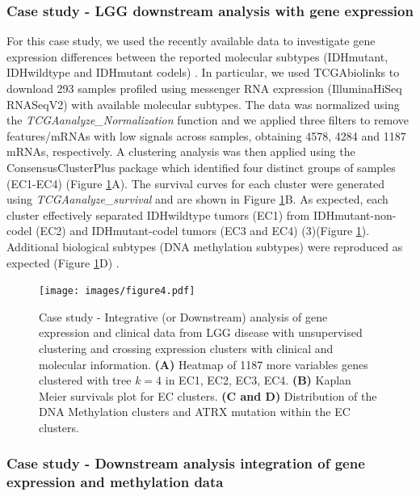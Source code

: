 \subsubsection*{Case study - LGG downstream analysis with gene expression}

For this case study, we used the recently available  data to investigate gene expression differences between the reported molecular subtypes (IDHmutant, IDHwildtype and IDHmutant codels) \cite{platforms2015comprehensive}. In particular, we used TCGAbiolinks to download 293 samples profiled using messenger RNA expression (IlluminaHiSeq RNASeqV2) with available molecular subtypes. The data was normalized using the \textit{TCGAanalyze\_Normalization} function and we applied three filters to remove features/mRNAs with low signals across samples, obtaining 4578, 4284 and 1187 mRNAs, respectively. A clustering analysis was then applied using the ConsensusClusterPlus package \cite{wilkerson2010consensusclusterplus} which identified four distinct groups of samples (EC1-EC4) (Figure \ref{fig:caseexp}A). The survival curves for each cluster were generated using \textit{TCGAanalyze\_survival} and are shown in Figure \ref{fig:caseexp}B. As expected, each cluster effectively separated IDHwildtype tumors (EC1) from IDHmutant-non-codel (EC2) and IDHmutant-codel tumors (EC3 and EC4) (3)(Figure \ref{fig:caseexp}). Additional biological subtypes (DNA methylation subtypes) were reproduced as expected (Figure \ref{fig:caseexp}D) \cite{platforms2015comprehensive}.

\begin{figure}
\centering
\texttt{[image: images/figure4.pdf]}
\caption[Case study - LGG downstream analysis with gene expression]{Case study - Integrative (or Downstream) analysis of gene expression and clinical data from LGG disease with unsupervised clustering and crossing expression clusters with clinical and molecular information. \textbf{(A)} Heatmap of 1187 more variables genes clustered with tree $k = 4$ in EC1, EC2, EC3, EC4. \textbf{(B)} Kaplan Meier survivals plot for EC clusters. \textbf{(C and D)} Distribution of the DNA Methylation clusters and ATRX mutation within the EC clusters.}
\label{fig:caseexp}
\end{figure}

\subsubsection*{Case study - Downstream analysis integration of gene expression and methylation data}

